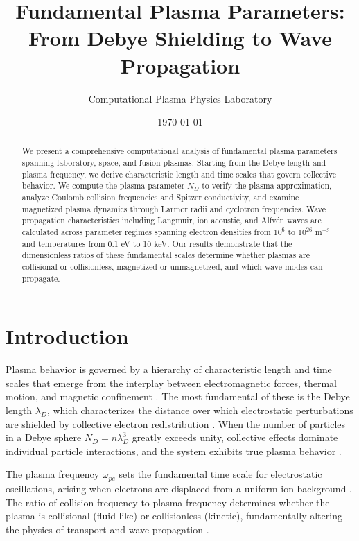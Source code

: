 \documentclass[11pt,a4paper]{article}
\title{Fundamental Plasma Parameters:\\From Debye Shielding to Wave Propagation}
\author{Computational Plasma Physics Laboratory}
\date{\today}
\begin{document}
\maketitle

\begin{abstract}
We present a comprehensive computational analysis of fundamental plasma parameters spanning laboratory, space, and fusion plasmas. Starting from the Debye length and plasma frequency, we derive characteristic length and time scales that govern collective behavior. We compute the plasma parameter $N_D$ to verify the plasma approximation, analyze Coulomb collision frequencies and Spitzer conductivity, and examine magnetized plasma dynamics through Larmor radii and cyclotron frequencies. Wave propagation characteristics including Langmuir, ion acoustic, and Alfvén waves are calculated across parameter regimes spanning electron densities from $10^{6}$ to $10^{26}$ m$^{-3}$ and temperatures from 0.1 eV to 10 keV. Our results demonstrate that the dimensionless ratios of these fundamental scales determine whether plasmas are collisional or collisionless, magnetized or unmagnetized, and which wave modes can propagate.
\end{abstract}

\section{Introduction}

Plasma behavior is governed by a hierarchy of characteristic length and time scales that emerge from the interplay between electromagnetic forces, thermal motion, and magnetic confinement \cite{chen1984introduction, goldston1995introduction}. The most fundamental of these is the Debye length $\lambda_D$, which characterizes the distance over which electrostatic perturbations are shielded by collective electron redistribution \cite{debye1923theory}. When the number of particles in a Debye sphere $N_D = n \lambda_D^3$ greatly exceeds unity, collective effects dominate individual particle interactions, and the system exhibits true plasma behavior \cite{spitzer1956physics}.

The plasma frequency $\omega_{pe}$ sets the fundamental time scale for electrostatic oscillations, arising when electrons are displaced from a uniform ion background \cite{tonks1929oscillations}. The ratio of collision frequency to plasma frequency determines whether the plasma is collisional (fluid-like) or collisionless (kinetic), fundamentally altering the physics of transport and wave propagation \cite{krall1973principles}.
\end{document}
